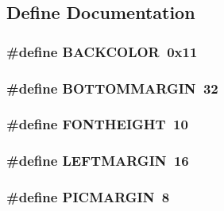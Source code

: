 \subsection{Define Documentation}
\hypertarget{WL__TEXT_8C_ad71a9c1dfce508755e2d04d2cdef41e0}{
\subsubsection[{BACKCOLOR}]{\setlength{\rightskip}{0pt plus 5cm}\#define BACKCOLOR~0x11}}
\label{WL__TEXT_8C_ad71a9c1dfce508755e2d04d2cdef41e0}
\hypertarget{WL__TEXT_8C_a577fa4f3a64146902fa2a7ecaed71c28}{
\subsubsection[{BOTTOMMARGIN}]{\setlength{\rightskip}{0pt plus 5cm}\#define BOTTOMMARGIN~32}}
\label{WL__TEXT_8C_a577fa4f3a64146902fa2a7ecaed71c28}
\hypertarget{WL__TEXT_8C_afb76020ea3a049e31eef16a4bf89bdd1}{
\subsubsection[{FONTHEIGHT}]{\setlength{\rightskip}{0pt plus 5cm}\#define FONTHEIGHT~10}}
\label{WL__TEXT_8C_afb76020ea3a049e31eef16a4bf89bdd1}
\hypertarget{WL__TEXT_8C_afb683e4c7e8d160620e6f7304c30419e}{
\subsubsection[{LEFTMARGIN}]{\setlength{\rightskip}{0pt plus 5cm}\#define LEFTMARGIN~16}}
\label{WL__TEXT_8C_afb683e4c7e8d160620e6f7304c30419e}
\hypertarget{WL__TEXT_8C_a8dbc8ce36d68d66d75e1c5667b7e5def}{
\subsubsection[{PICMARGIN}]{\setlength{\rightskip}{0pt plus 5cm}\#define PICMARGIN~8}}
\label{WL__TEXT_8C_a8dbc8ce36d68d66d75e1c5667b7e5def}
